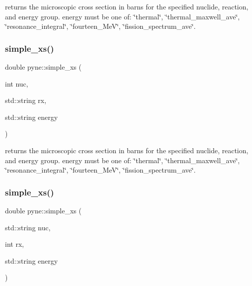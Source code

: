returns the microscopic cross section in barns for the specified nuclide, reaction, and energy group. energy must be one of\+: \char`\"{}thermal\char`\"{}, \char`\"{}thermal\+\_\+maxwell\+\_\+ave\char`\"{}, \char`\"{}resonance\+\_\+integral\char`\"{}, \char`\"{}fourteen\+\_\+\+Me\+V\char`\"{}, \char`\"{}fission\+\_\+spectrum\+\_\+ave\char`\"{}. \mbox{\label{namespacepyne_ab10ec6870a2330af652b07b4dc6dcb27}} 
\subsubsection{\texorpdfstring{simple\+\_\+xs()}{simple\_xs()}\hspace{0.1cm}{\footnotesize\ttfamily [2/4]}}
{\footnotesize\ttfamily double pyne\+::simple\+\_\+xs (\begin{DoxyParamCaption}\item[{int}]{nuc,  }\item[{std\+::string}]{rx,  }\item[{std\+::string}]{energy }\end{DoxyParamCaption})}

returns the microscopic cross section in barns for the specified nuclide, reaction, and energy group. energy must be one of\+: \char`\"{}thermal\char`\"{}, \char`\"{}thermal\+\_\+maxwell\+\_\+ave\char`\"{}, \char`\"{}resonance\+\_\+integral\char`\"{}, \char`\"{}fourteen\+\_\+\+Me\+V\char`\"{}, \char`\"{}fission\+\_\+spectrum\+\_\+ave\char`\"{}. \mbox{\label{namespacepyne_a5175275a09e97886dcf15a082a719812}} 
\subsubsection{\texorpdfstring{simple\+\_\+xs()}{simple\_xs()}\hspace{0.1cm}{\footnotesize\ttfamily [3/4]}}
{\footnotesize\ttfamily double pyne\+::simple\+\_\+xs (\begin{DoxyParamCaption}\item[{std\+::string}]{nuc,  }\item[{int}]{rx,  }\item[{std\+::string}]{energy }\end{DoxyParamCaption})}

